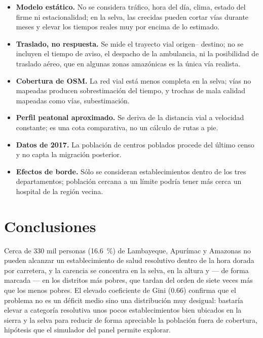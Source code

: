\documentclass[11pt,a4paper]{article}
\begin{document}
\begin{itemize}
  \item \textbf{Modelo est\'atico.} No se considera tr\'afico, hora del d\'ia,
        clima, estado del firme ni estacionalidad; en la selva, las crecidas
        pueden cortar v\'ias durante meses y elevar los tiempos reales muy por
        encima de lo estimado.
  \item \textbf{Traslado, no respuesta.} Se mide el trayecto vial origen--%
        destino; no se incluyen el tiempo de aviso, el despacho de la
        ambulancia, ni la posibilidad de traslado a\'ereo, que en algunas
        zonas amaz\'onicas es la \'unica v\'ia realista.
  \item \textbf{Cobertura de OSM.} La red vial est\'a menos completa en la
        selva; v\'ias no mapeadas producen sobrestimaci\'on del tiempo, y
        trochas de mala calidad mapeadas como v\'ias, subestimaci\'on.
  \item \textbf{Perfil peatonal aproximado.} Se deriva de la distancia vial a
        velocidad constante; es una cota comparativa, no un c\'alculo de rutas
        a pie.
  \item \textbf{Datos de 2017.} La poblaci\'on de centros poblados procede del
        \'ultimo censo y no capta la migraci\'on posterior.
  \item \textbf{Efectos de borde.} S\'olo se consideran establecimientos
        dentro de los tres departamentos; poblaci\'on cercana a un l\'imite
        podr\'ia tener m\'as cerca un hospital de la regi\'on vecina.
\end{itemize}

\section{Conclusiones}
Cerca de \num{330} mil personas (\SI{16.6}{\percent}) de Lambayeque, Apur\'imac y
Amazonas no pueden alcanzar un establecimiento de salud resolutivo dentro de la
hora dorada por carretera, y la carencia se concentra en la selva, en la altura
y --- de forma marcada --- en los distritos m\'as pobres, que tardan del orden de
siete veces m\'as que los menos pobres. El elevado coeficiente de Gini
(\num{0.66}) confirma que el problema no es un d\'eficit medio sino una
distribuci\'on muy desigual: bastar\'ia elevar a categor\'ia resolutiva unos
pocos establecimientos bien ubicados en la sierra y la selva para reducir de
forma apreciable la poblaci\'on fuera de cobertura, hip\'otesis que el simulador
del panel permite explorar.
\end{document}
